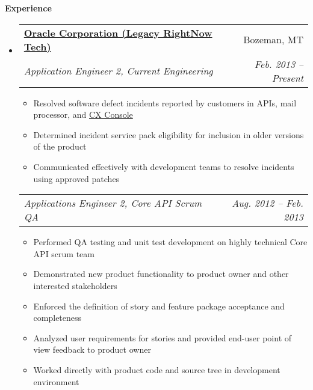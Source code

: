 \documentclass[letterpaper,11pt]{article}
\makeatletter
\newcommand{\resitem}[1]{\item #1 \vspace{-2pt}}
\newcommand{\resheading}[1]{{\large \colorbox{mygrey}{\begin{minipage}{\textwidth}{\textbf{#1 \vphantom{p\^{E}}}}\end{minipage}}}}
\newcommand{\ressubheading}[4]{
    \begin{tabular*}{6.5in}{l@{\extracolsep{\fill}}r}
      \textbf{#1} & #2 \\
      \textit{#3} & \textit{#4} \\
  \end{tabular*}\vspace{-6pt}}
\newcommand{\ressubsubheading}[2]{
    \begin{tabular*}{6.5in}{l@{\extracolsep{\fill}}r}
      \textit{#1} & \textit{#2} \\
  \end{tabular*}\vspace{-6pt}}
\makeatother
\begin{document}
  \resheading{Experience}
  \begin{itemize}
    \item 
      \ressubheading{\href{http://www.oracle.com}{Oracle Corporation (Legacy RightNow Tech)}}{Bozeman, MT}
      {Application Engineer 2, Current Engineering}{Feb. 2013 -- Present}
      { \footnotesize
	\begin{itemize}
	    \resitem{Resolved software defect incidents reported by customers in APIs, mail processor, and \href{http://www.oracle.com/us/solutions/customer-experience/oracle-customer-experience/overview/index.html}{CX Console}}
	    \resitem{Determined incident service pack eligibility for inclusion in older versions of the product}
	    \resitem{Communicated effectively with development teams to resolve incidents using approved patches}
	\end{itemize}
      }

      \ressubsubheading{Applications Engineer 2, Core API Scrum QA}{Aug. 2012 -- Feb. 2013}
      { \footnotesize
	\begin{itemize}
	    \resitem{Performed QA testing and unit test development on highly technical Core API scrum team}
	    \resitem{Demonstrated new product functionality to product owner and other interested stakeholders}
	    \resitem{Enforced the definition of story and feature package acceptance and completeness}
	    \resitem{Analyzed user requirements for stories and provided end-user point of view feedback to product owner}
	    \resitem{Worked directly with product code and source tree in development environment}
	\end{itemize}
      }


\end{itemize}
\end{document}
